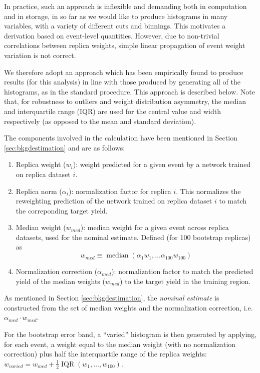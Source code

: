 In practice, such an approach is inflexible and demanding both in computation and 
in storage, in so far as we would like to produce histograms in many variables, with a 
variety of different cuts and binnings. This motivates a derivation based on event-level 
quantities. However, due to non-trivial correlations between replica weights, simple linear 
propagation of event weight variation is not correct.

We therefore adopt an approach which has been empirically found to produce results (for this
analysis) in line with those produced by generating all of the histograms, as in the standard 
procedure. This approach is described below. Note that, for robustness to outliers and weight distribution 
asymmetry, the median and interquartile range (IQR) are used for the central value and width 
respectively (as opposed to the mean and standard deviation).

The components involved in the calculation have been mentioned in Section \ref{sec:bkgdestimation} and 
are as follows:
\begin{enumerate}
\item Replica weight ($w_{i}$): weight predicted for a given event by a network trained on replica 
dataset $i$.
\item Replica norm ($\alpha_{i}$): normalization factor for replica $i$. This normalizes the reweighting 
prediction of the network trained on replica dataset $i$ to match the correponding target yield.
\item Median weight ($w_{med}$): median weight for a given event across replica datasets, used for the nominal estimate. Defined (for 100 bootstrap replicas) as
\begin{equation}
w_{med} \equiv \operatorname{median}(\alpha_{1}w_{1}, \ldots \alpha_{100}w_{100})
\end{equation}
\item Normalization correction ($\alpha_{med}$): normalization factor to match the predicted yield of the median weights
($w_{med}$) to the target yield in the training region.
\end{enumerate}

As mentioned in Section \ref{sec:bkgdestimation}, the \emph{nominal estimate} is constructed from the set of
median weights and the normalization correction, i.e. $\alpha_{med}\cdot w_{med}$.

For the bootstrap error band, a ``varied'' histogram is then generated by applying, for each event, a weight
equal to the median weight (with no normalization correction) plus half the interquartile range of 
the replica weights: $w_{varied} = w_{med} + \frac{1}{2}\operatorname{IQR}(w_{1},\ldots, w_{100})$.

